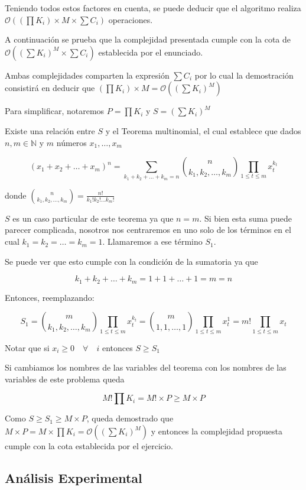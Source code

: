 Teniendo todos estos factores en cuenta, se puede deducir que el algoritmo realiza $\mathcal{O}((\prod K_i) \times M \times \sum C_i)$ operaciones.

A continuación se prueba que la complejidad presentada cumple con la cota de $\mathcal{O}((\sum K_i)^M \times \sum C_i)$ establecida por el enunciado.

Ambas complejidades comparten la expresión $\sum C_i$ por lo cual la demostración consistirá en deducir que $(\prod K_i) \times M = \mathcal{O}((\sum K_i)^M)$

Para simplificar, notaremos $P = \prod K_i$ y $S = (\sum K_i)^M$

Existe una relación entre $S$ y el Teorema multinomial, el cual establece que dados $n, m \in \mathbb{N}$ y $m$ números $x_1, \ldots , x_m$

$$(x_1 + x_2 + \ldots + x_m)^n = \sum_{k_1 + k_2 + \ldots + k_m = n} \binom{n}{k_1, k_2, \ldots , k_m} \prod_{1 \leq t \leq m} x_t^{k_t}$$

donde $\binom{n}{k_1, k_2, \ldots , k_m} = \frac{n!}{k_1! k_2! \ldots k_m!}$

$S$ es un caso particular de este teorema ya que $n = m$. Si bien esta suma puede parecer complicada, nosotros nos centraremos en uno solo de los términos en el cual $k_1 = k_2 = \ldots = k_m = 1$. Llamaremos a ese término $S_1$.

Se puede ver que esto cumple con la condición de la sumatoria ya que

$$k_1 + k_2 + \ldots + k_m = 1 + 1 + \ldots + 1 = m = n$$

Entonces, reemplazando:

$$S_1 = \binom{m}{k_1, k_2, \ldots , k_m} \prod_{1 \leq t \leq m} x_t^{k_t} = \binom{m}{1, 1, \ldots , 1} \prod_{1 \leq t \leq m} x_t^{1} = m! \prod_{1 \leq t \leq m} x_t $$

Notar que si $x_i \geq 0 \quad \forall \quad i$ entonces $S \geq S_1$

Si cambiamos los nombres de las variables del teorema con los nombres de las variables de este problema queda

$$M! \prod K_i = M! \times P \geq M \times P$$

Como $S \geq S_1 \geq M \times P$, queda demostrado que $M \times P = M \times \prod K_i = \mathcal{O}((\sum K_i)^M)$ y entonces la complejidad propuesta cumple con la cota establecida por el ejercicio.\QEDB

\subsection{Análisis Experimental}

